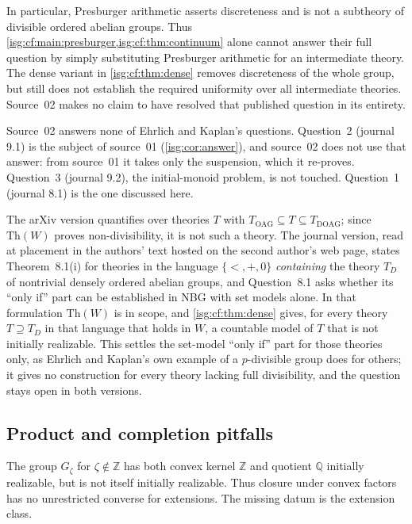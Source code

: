 \documentclass[11pt]{article}
\theoremstyle{definition}
\theoremstyle{remark}
\newcommand{\Z}{\mathbb{Z}}
\newcommand{\Q}{\mathbb{Q}}
\begin{document}
In particular, Presburger arithmetic asserts discreteness and is not a
subtheory of divisible ordered abelian groups. Thus
\cref{isg:cf:main:presburger,isg:cf:thm:continuum} alone cannot answer
their full question by simply substituting Presburger arithmetic for an
intermediate theory. The dense variant in \cref{isg:cf:thm:dense} removes
discreteness of the whole group, but still does not establish the
required uniformity over all intermediate theories. Source~02 makes no
claim to have resolved that published question in its entirety.

Source~02 answers none of Ehrlich and Kaplan's questions. Question~2
(journal 9.1) is the subject of source~01 (\cref{isg:cor:answer}), and
source~02 does not use that answer: from source~01 it takes only the
suspension, which it re-proves. Question~3 (journal 9.2), the
initial-monoid problem, is not touched. Question~1 (journal 8.1) is the
one discussed here.

\begin{remark}\label{isg:cf:rem:formulations}
The arXiv version quantifies over theories $T$ with
$T_{\mathrm{OAG}}\subseteq T\subseteq T_{\mathrm{DOAG}}$; since
$\mathrm{Th}(W)$ proves non-divisibility, it is not such a theory. The
journal version, read at placement in the authors' text hosted on the
second author's web page, states Theorem~8.1(i) for theories in the
language $\{<,+,0\}$ \emph{containing} the theory $T_D$ of nontrivial
densely ordered abelian groups, and Question~8.1 asks whether its ``only
if'' part can be established in NBG with set models alone. In that
formulation $\mathrm{Th}(W)$ is in scope, and \cref{isg:cf:thm:dense}
gives, for every theory $T\supseteq T_D$ in that language that holds in
$W$, a countable model of $T$ that is not initially realizable. This
settles the set-model ``only if'' part for those theories only, as
Ehrlich and Kaplan's own example of a $p$-divisible group does for
others; it gives no construction for every theory lacking full
divisibility, and the question stays open in both versions.
\end{remark}

\subsection{Product and completion pitfalls}
The group $G_\zeta$ for $\zeta\notin\Z$ has both convex kernel
$\Z$ and quotient $\Q$ initially realizable, but is not itself initially
realizable. Thus closure under convex factors has no unrestricted
converse for extensions. The missing datum is the extension class.
\end{document}
